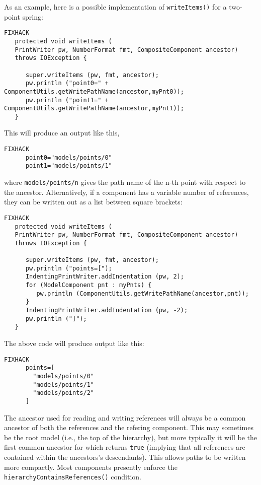 \documentclass{article}
\begin{document}
As an example, here is a possible implementation of {\tt writeItems()}
for a two-point spring:
\begin{lstlisting}FIXHACK
   protected void writeItems (
   PrintWriter pw, NumberFormat fmt, CompositeComponent ancestor)
   throws IOException {

      super.writeItems (pw, fmt, ancestor);
      pw.println ("point0=" + ComponentUtils.getWritePathName(ancestor,myPnt0));
      pw.println ("point1=" + ComponentUtils.getWritePathName(ancestor,myPnt1));
   }
\end{lstlisting}
This will produce an output like this,
\begin{lstlisting}FIXHACK
      point0="models/points/0"
      point1="models/points/1"
\end{lstlisting}
where {\tt models/points/n} gives the path name of the n-th point with
respect to the ancestor.
Alternatively, if a component has a variable number of references,
they can be written out as a list between square brackets:
\begin{lstlisting}FIXHACK
   protected void writeItems (
   PrintWriter pw, NumberFormat fmt, CompositeComponent ancestor)
   throws IOException {

      super.writeItems (pw, fmt, ancestor);
      pw.println ("points=[");
      IndentingPrintWriter.addIndentation (pw, 2);
      for (ModelComponent pnt : myPnts) {
         pw.println (ComponentUtils.getWritePathName(ancestor,pnt));
      }
      IndentingPrintWriter.addIndentation (pw, -2);
      pw.println ("]");
   }
\end{lstlisting}
The above code will produce output like this:
\begin{lstlisting}FIXHACK
      points=[
        "models/points/0"
        "models/points/1"
        "models/points/2"
      ]
\end{lstlisting}

\begin{sideblock}
The ancestor used for reading and writing references will always be a
common ancestor of both the references and the refering component.
This may sometimes be the root model (i.e., the top of the hierarchy),
but more typically it will be the first common ancestor for which
 returns {\tt true} (implying that all
references are contained within the ancestors's descendants).  This allows
paths to be written more compactly.
Most  components
presently enforce the {\tt hierarchyContainsReferences()} condition.
\end{sideblock}
\end{document}
